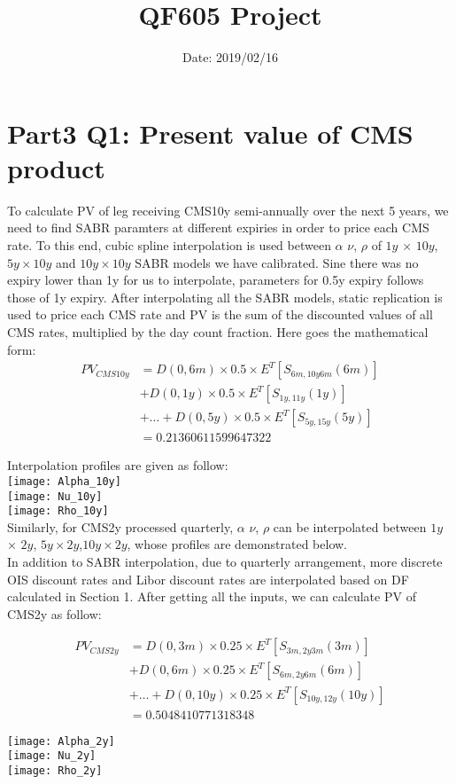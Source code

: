 \documentclass{article}
\title{\textbf{QF605 Project}}
\date{Date: 2019/02/16}
\begin{document}
	\maketitle

\section{Part3 Q1: Present value of CMS product}

\noindent To calculate PV of leg receiving CMS10y semi-annually over the next 5 years, we need to find SABR paramters at different expiries in order to price each CMS rate. To this end, cubic spline interpolation is used between $\alpha$ $\nu$, $\rho$ of $1y$ $\times$ $10y$, $5y\times10y$ and $10y\times10y$ SABR models we have calibrated. Sine there was no expiry lower than 1y for us to interpolate, parameters for 0.5y expiry follows those of 1y expiry. After interpolating all the SABR models, static replication is used to price each CMS rate and PV is the sum of the discounted values of all CMS rates, multiplied by the day count fraction. Here goes the mathematical form:
\begin{align*}
PV_{CMS10y}&=D(0,6m)\times 0.5 \times E^T [S_{6m,10y6m}(6m)] \\&+ D(0,1y) \times 0.5 \times E^T [S_{1y,11y}(1y)]\\&+ \dots 
+D(0,5y) \times 0.5 \times E^T [S_{5y,15y}(5y)]\\&= 0.21360611599647322
\end{align*}

Interpolation profiles are given as follow:\\
\texttt{[image: Alpha\_10y]}\\
\texttt{[image: Nu\_10y]}\\
\texttt{[image: Rho\_10y]}\\

\noindent Similarly, for CMS2y processed quarterly, $\alpha$ $\nu$, $\rho$ can be interpolated between $1y$ $\times$ $2y$, $5y\times2y$,$10y\times2y$, whose profiles are demonstrated below.\\ In addition to SABR interpolation, due to quarterly arrangement, more discrete OIS discount rates and Libor discount rates are interpolated based on DF calculated in Section 1. After getting all the inputs, we can calculate PV of CMS2y as follow:

\begin{align*}
PV_{CMS2y}&=D(0,3m)\times 0.25 \times E^T [S_{3m,2y3m}(3m)] \\&+ D(0,6m) \times 0.25 \times E^T [S_{6m,2y6m}(6m)]\\&+ \dots 
+D(0,10y) \times 0.25 \times E^T [S_{10y,12y}(10y)]\\&= 0.5048410771318348
\end{align*}

\texttt{[image: Alpha\_2y]}\\
\texttt{[image: Nu\_2y]}\\
\texttt{[image: Rho\_2y]}\\
\end{document}
